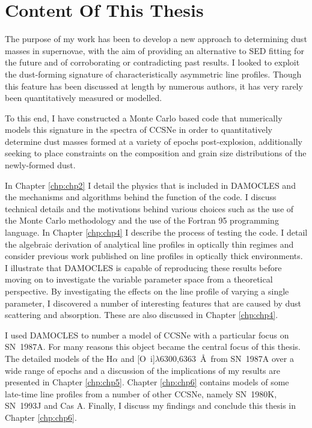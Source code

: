 \section{Content Of This Thesis}
The purpose of my work has been to develop a new approach to determining dust masses in supernovae, with the aim of providing an alternative to SED fitting for the future and of corroborating or contradicting past results.  I looked to exploit the dust-forming signature of characteristically asymmetric line profiles.  Though this feature has been discussed at length by numerous authors, it has very rarely been quantitatively measured or modelled.

To this end, I have constructed a Monte Carlo based code that numerically models this signature in the spectra of CCSNe in order to quantitatively determine dust masses formed at a variety of epochs post-explosion, additionally seeking to place constraints on the composition and grain size distributions of the newly-formed dust.

In Chapter \ref{chp:chp2} I detail the physics that is included in DAMOCLES and the mechanisms and algorithms behind the function of the code.  I discuss technical details and the motivations behind various choices such as the use of the Monte Carlo methodology and the use of the Fortran 95 programming language.  In Chapter \ref{chp:chp4} I describe the process of testing the code.  I detail the algebraic derivation of analytical line profiles in optically thin regimes and consider previous work published on line profiles in optically thick environments.  I illustrate that DAMOCLES is capable of reproducing these results before moving on to investigate the variable parameter space from a theoretical perspective.  By investigating the effects on the line profile of varying a single parameter, I discovered a number of interesting features that are caused by dust scattering and absorption.  These are also discussed in Chapter \ref{chp:chp4}.  

I used DAMOCLES to number a model of CCSNe with a particular focus on SN~1987A.  For many reasons this object became the central focus of this thesis. The detailed models of the H$\alpha$ and [O~{\sc i}]$\lambda$6300,6363~\AA\ from SN~1987A over a wide range of epochs and a discussion of the implications of my results are presented in Chapter \ref{chp:chp5}.  Chapter \ref{chp:chp6} contains models of some late-time line profiles from a number of other CCSNe, namely SN~1980K, SN~1993J and Cas A.  Finally, I discuss my findings and conclude this thesis in Chapter \ref{chp:chp6}.

